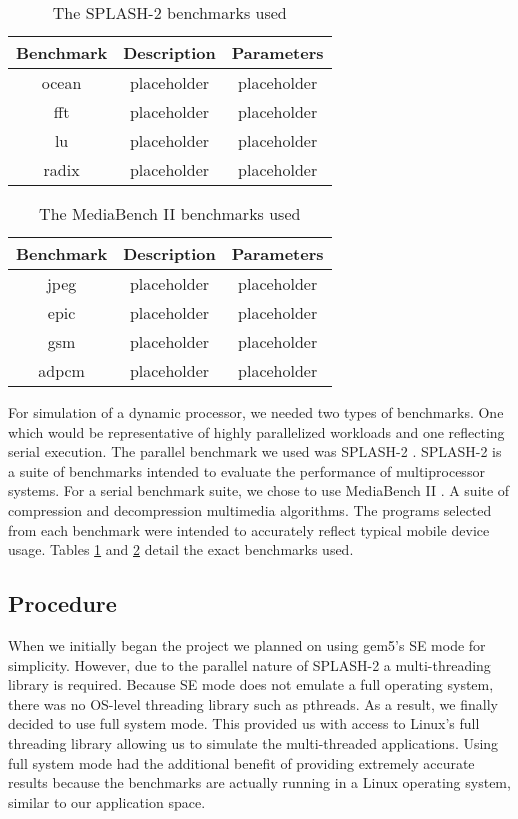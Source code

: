 \begin{table}[!t]
	\renewcommand{\arraystretch}{1.9}
	\centering
	\begin{tabular}{|c|c|c|}
		\hline
		Benchmark & Description & Parameters\\
		\hline
		ocean & placeholder & placeholder\\
		\hline
		fft & placeholder & placeholder\\
		\hline
		lu & placeholder & placeholder\\
		\hline
		radix & placeholder & placeholder\\
		\hline
	\end{tabular}
	\caption{The SPLASH-2 benchmarks used}
	\label{tab:splash2_benchmarks}
\end{table}

\begin{table}[!t]
	\renewcommand{\arraystretch}{1.9}
	\centering
	\begin{tabular}{|c|c|c|}
		\hline
		Benchmark & Description & Parameters\\
		\hline
		jpeg & placeholder & placeholder\\
		\hline
		epic & placeholder & placeholder\\
		\hline
		gsm & placeholder & placeholder\\
		\hline
		adpcm & placeholder & placeholder\\
		\hline
	\end{tabular}
	\caption{The MediaBench II benchmarks used}
	\label{tab:mb2_benchmarks}
\end{table}

For simulation of a dynamic processor, we needed two types of benchmarks. One which would be representative of highly parallelized workloads and one reflecting serial execution. The parallel benchmark we used was SPLASH-2 \cite{splash2}. SPLASH-2 is a suite of benchmarks intended to evaluate the performance of multiprocessor systems. For a serial benchmark suite, we chose to use MediaBench II \cite{mb2}. A suite of compression and decompression multimedia algorithms. The programs selected from each benchmark were intended to accurately reflect typical mobile device usage. Tables \ref{tab:splash2_benchmarks} and \ref{tab:mb2_benchmarks} detail the exact benchmarks used.

\subsection{Procedure}
When we initially began the project we planned on using gem5's SE mode for simplicity. However, due to the parallel nature of SPLASH-2 a multi-threading library is required. Because SE mode does not emulate a full operating system, there was no OS-level threading library such as pthreads. As a result, we finally decided to use full system mode. This provided us with access to Linux's full threading library allowing us to simulate the multi-threaded applications. Using full system mode had the additional benefit of providing extremely accurate results because the benchmarks are actually running in a Linux operating system, similar to our application space.

